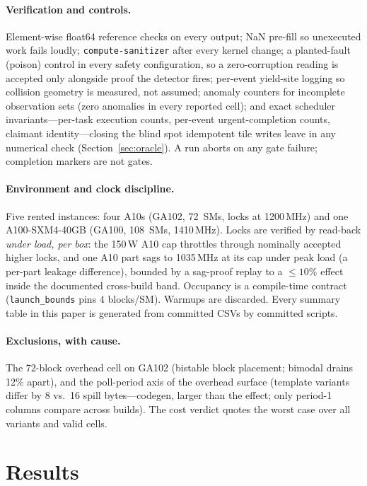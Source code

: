 \documentclass[11pt]{article}
\begin{document}
\paragraph{Verification and controls.} Element-wise float64 reference
checks on every output; NaN pre-fill so unexecuted work fails loudly;
\texttt{compute-sanitizer} after every kernel change; a planted-fault
(poison) control in every safety configuration, so a zero-corruption
reading is accepted only alongside proof the detector fires;
per-event yield-site logging so collision geometry is measured, not
assumed; anomaly counters for incomplete observation sets (zero
anomalies in every reported cell); and exact scheduler
invariants---per-task execution counts, per-event urgent-completion
counts, claimant identity---closing the blind spot idempotent tile
writes leave in any numerical check (Section~\ref{sec:oracle}). A run
aborts on any gate failure; completion markers are not gates.

\paragraph{Environment and clock discipline.} Five rented instances:
four A10s (GA102, 72~SMs, locks at 1200\,MHz) and one
A100-SXM4-40GB (GA100, 108~SMs, 1410\,MHz). Locks are verified by
read-back \emph{under load, per box}: the 150\,W A10 cap throttles
through nominally accepted higher locks, and one A10 part sags to
1035\,MHz at its cap under peak load (a per-part leakage difference),
bounded by a sag-proof replay to a ${\le}10\%$ effect inside the
documented cross-build band. Occupancy is a compile-time contract
(\texttt{launch\_bounds} pins 4 blocks/SM). Warmups are discarded.
Every summary table in this paper is generated from committed CSVs by
committed scripts.

\paragraph{Exclusions, with cause.} The 72-block overhead cell on
GA102 (bistable block placement; bimodal drains 12\% apart), and the
poll-period axis of the overhead surface (template variants differ by
8 vs.\ 16 spill bytes---codegen, larger than the effect; only
period-1 columns compare across builds). The cost verdict quotes the
worst case over all variants and valid cells.

\section{Results}
\end{document}
